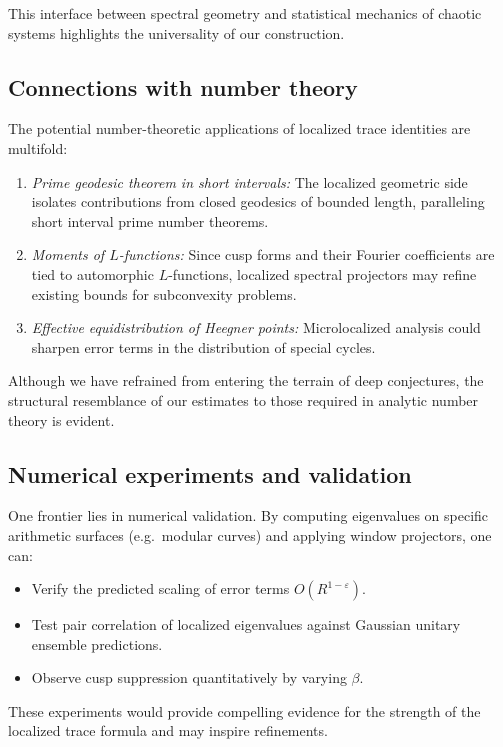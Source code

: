 This interface between spectral geometry and statistical mechanics of chaotic systems highlights the universality of our construction.

\subsection*{Connections with number theory}

The potential number-theoretic applications of localized trace identities are multifold:
\begin{enumerate}
\item \emph{Prime geodesic theorem in short intervals:} The localized geometric side isolates contributions from closed geodesics of bounded length, paralleling short interval prime number theorems.
\item \emph{Moments of $L$-functions:} Since cusp forms and their Fourier coefficients are tied to automorphic $L$-functions, localized spectral projectors may refine existing bounds for subconvexity problems.
\item \emph{Effective equidistribution of Heegner points:} Microlocalized analysis could sharpen error terms in the distribution of special cycles.
\end{enumerate}

Although we have refrained from entering the terrain of deep conjectures, the structural resemblance of our estimates to those required in analytic number theory is evident.

\subsection*{Numerical experiments and validation}

One frontier lies in numerical validation. By computing eigenvalues on specific arithmetic surfaces (e.g.\ modular curves) and applying window projectors, one can:
\begin{itemize}
\item Verify the predicted scaling of error terms $O(R^{1-\varepsilon})$.
\item Test pair correlation of localized eigenvalues against Gaussian unitary ensemble predictions.
\item Observe cusp suppression quantitatively by varying $\beta$.
\end{itemize}
These experiments would provide compelling evidence for the strength of the localized trace formula and may inspire refinements.

